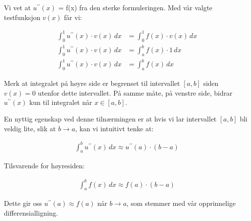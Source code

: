 \documentclass[../main.tex]{subfiles}
\begin{document}
Vi vet at $u^{\prime\prime}(x)$ = f(x) fra den sterke formuleringen. Med vår valgte testfunksjon $v(x)$ får vi:

\begin{align*}
    \int_0^1 u^{\prime\prime}(x) \cdot v(x) \, dx & = \int_0^1 f(x) \cdot v(x) \, dx \\
    \int_0^1 u^{\prime\prime}(x) \cdot v(x) \, dx & = \int_a^b f(x) \cdot 1 \, dx    \\
    \int_0^1 u^{\prime\prime}(x) \cdot v(x) \, dx & = \int_a^b f(x) \, dx
\end{align*}

Merk at integralet på høyre side er begrenset til intervallet $[a,b]$ siden $v(x)=0$ utenfor dette intervallet. På samme måte, på venstre side, bidrar $u^{\prime\prime}(x)$ kun til integralet når $x \in [a,b]$.

En nyttig egenskap ved denne tilnærmingen er at hvis vi lar intervallet $[a,b]$ bli veldig lite, slik at $b \rightarrow a$, kan vi intuitivt tenke at:

\begin{align*}
    \int_a^b u^{\prime\prime}(x) \, dx \approx u^{\prime\prime}(a) \cdot (b-a)
\end{align*}

Tilsvarende for høyresiden:

\begin{align*}
    \int_a^b f(x) \, dx \approx f(a) \cdot (b-a)
\end{align*}

Dette gir oss $u^{\prime\prime}(a) \approx f(a)$ når $b \rightarrow a$, som stemmer med vår opprinnelige differensialligning.
\end{document}
